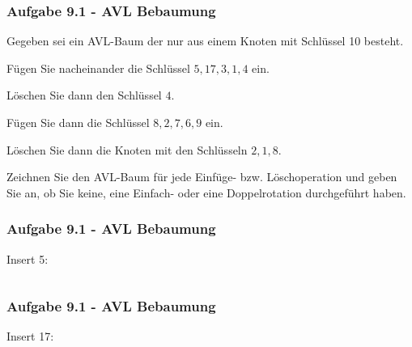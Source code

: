 \begin{frame}
    \frametitle{Aufgabe 9.1 - AVL Bebaumung}
    Gegeben sei ein AVL-Baum der nur aus einem Knoten mit Schlüssel 10 besteht.

    \medskip
    Fügen Sie nacheinander die Schlüssel $5, 17, 3, 1, 4$ ein.

    \smallskip
    Löschen Sie dann den Schlüssel $4$.

    \smallskip
    Fügen Sie dann die Schlüssel $8, 2, 7, 6, 9$ ein.

    \smallskip
    Löschen Sie dann die Knoten mit den Schlüsseln $2, 1, 8$.

    \medskip
    Zeichnen Sie den AVL-Baum für jede Einfüge- bzw. Löschoperation und geben Sie an,
    ob Sie keine, eine Einfach- oder eine Doppelrotation durchgeführt haben.
\end{frame}

\begin{frame}[t]
    \frametitle{Aufgabe 9.1 - AVL Bebaumung}
    Insert 5:

    \bigskip
    \bigskip

    \begin{columns}
        \begin{column}{0.48\textwidth}
            \begin{center}
            \end{center}
        \end{column}
        \begin{column}{0.48\textwidth}
        \end{column}
    \end{columns}
\end{frame}

\begin{frame}[t]
    \frametitle{Aufgabe 9.1 - AVL Bebaumung}
    Insert 17:

    \bigskip
    \bigskip

    \begin{columns}
        \begin{column}{0.48\textwidth}
            \begin{center}
            \end{center}
        \end{column}
        \begin{column}{0.48\textwidth}
        \end{column}
    \end{columns}
\end{frame}

